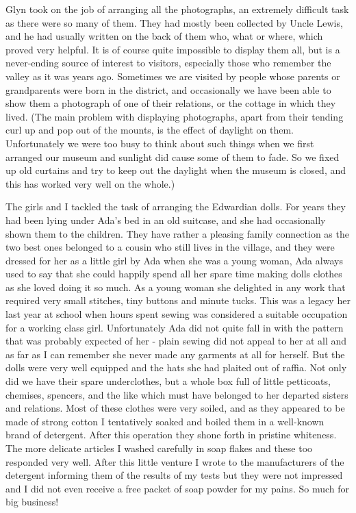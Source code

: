Glyn took on the job of arranging all the photographs, an extremely difficult task as there were so many of them. They had mostly been collected by Uncle Lewis, and he had usually written on the back of them who, what or where, which proved very helpful. It is of course quite impossible to display them all, but is a never-ending source of interest to visitors, especially those who remember the valley as it was years ago. Sometimes we are visited by people whose parents or grandparents were born in the district, and occasionally we have been able to show them a photograph of one of their relations, or the cottage in which they lived. (The main problem with displaying photographs, apart from their tending curl up and pop out of the mounts, is the effect of daylight on them. Unfortunately we were too busy to think about such things when we first arranged our museum and sunlight did cause some of them to fade. So we fixed up old curtains and try to keep out the daylight when the museum is closed, and this has worked very well on the whole.)

The girls and I tackled the task of arranging the Edwardian dolls. For years they had been lying under Ada's bed in an old suitcase, and she had occasionally shown them to the children. They have rather a pleasing family connection as the two best ones belonged to a cousin who still lives in the village, and they were dressed for her as a little girl by Ada when she was a young woman, Ada always used to say that she could happily spend all her spare time making dolls clothes as she loved doing it so much. As a young woman she delighted in any work that required very small stitches, tiny buttons and minute tucks. This was a legacy her last year at school when hours spent sewing was considered a suitable occupation for a working class girl. Unfortunately Ada did not quite fall in with the pattern that was probably expected of her - plain sewing did not appeal to her at all and as far as I can remember she never made any garments at all for herself. But the dolls were very well equipped and the hats she had plaited out of raffia. Not only did we have their spare underclothes, but a whole box full of little petticoats, chemises, spencers, and the like which must have belonged to her departed sisters and relations. Most of these clothes were very soiled, and as they appeared to be made of strong cotton I tentatively soaked and boiled them in a well-known brand of detergent. After this operation they shone forth in pristine whiteness. The more delicate articles I washed carefully in soap flakes and these too responded very well. After this little venture I wrote to the manufacturers of the detergent informing them of the results of my tests but they were not impressed and I did not even receive a free packet of soap powder for my pains. So much for big business!

